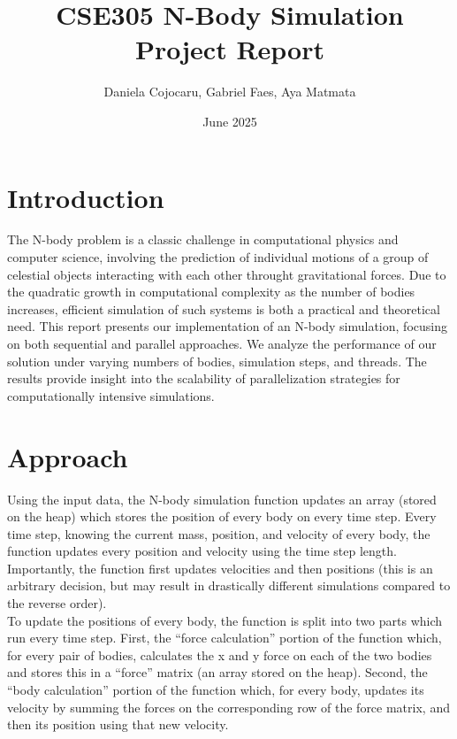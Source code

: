 \documentclass{article}
\title{CSE305 N-Body Simulation Project Report}
\author{Daniela Cojocaru, Gabriel Faes, Aya Matmata}
\date{June 2025}
\begin{document}
\maketitle

\section{Introduction}
The N-body problem is a classic challenge in computational physics and computer science, involving the prediction of individual motions of a group of celestial objects interacting with each other throught gravitational forces. Due to the quadratic growth in computational complexity as the number of bodies increases, efficient simulation of such systems is both a practical and theoretical need. This report presents our implementation of an N-body simulation, focusing on both sequential and parallel approaches. We analyze the performance of our solution under varying numbers of bodies, simulation steps, and threads. The results provide insight into the scalability of parallelization strategies for computationally intensive simulations.

\section{Approach}
Using the input data, the N-body simulation function updates an array (stored on the heap) which stores the position of every body on every time step. Every time step, knowing the current mass, position, and velocity of every body, the function updates every position and velocity using the time step length. Importantly, the function first updates velocities and then positions (this is an arbitrary decision, but may result in drastically different simulations compared to the reverse order).\\


To update the positions of every body, the function is split into two parts which run every time step. First, the “force calculation” portion of the function which, for every pair of bodies, calculates the x and y force on each of the two bodies and stores this in a “force” matrix (an array stored on the heap). Second, the “body calculation” portion of the function which, for every body, updates its velocity by summing the forces on the corresponding row of the force matrix, and then its position using that new velocity.\\
\end{document}
